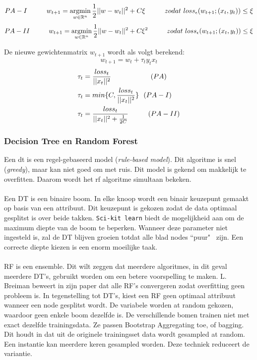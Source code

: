\[
   PA-I \hspace*{1cm} w_{t+1}= \operatorname*{argmin}_{w \in \mathbb{R}^n}
     \frac{1}{2}||w-w_t||^2 + C\xi \hspace*{1cm} zodat \ loss_{\epsilon} (w_{t+1};(x_t,y_t)) \leq \xi
\]
\[
   PA-II \hspace*{1cm} w_{t+1}= \operatorname*{argmin}_{w \in \mathbb{R}^n}
     \frac{1}{2}||w-w_t||^2 + C\xi^2 \hspace*{1cm} zodat \ loss_{\epsilon} (w_{t+1};(x_t,y_t)) \leq \xi
\]

De nieuwe gewichtenmatrix $w_{t+1}$ wordt als volgt berekend:
\[
w_{t+1}=w_t+ \tau_t y_t x_t
\]
\begin{align*}
\tau_t &= \frac{loss_t}{||x_t||^2} \tab \tab (PA)\\
\tau_t &= min \{ C, \frac{loss_t}{||x_t||^2} \} \ \ (PA-I)\\
\tau_t &= \frac{loss_t}{||x_t||^2+\frac{1}{2C}} \tab (PA-II) 
\end{align*}


\subsubsection*{Decision Tree en Random Forest}
Een \gls{dt} is een regel-gebaseerd model (\textit{rule-based model}). Dit algoritme is snel (\textit{greedy}), maar kan niet goed om met ruis. Dit model is gekend om makkelijk te overfitten. Daarom wordt het \gls{rf} algoritme simultaan bekeken.
\\\\
Een DT is een binaire boom. In elke knoop wordt een binair keuzepunt gemaakt op basis van een attribuut. Dit keuzepunt is gekozen zodat de data optimaal gesplitst is over beide takken. \texttt{Sci-kit learn} biedt de mogelijkheid aan om de maximum diepte van de boom te beperken. Wanneer deze parameter niet ingesteld is, zal de DT blijven groeien totdat alle blad nodes ``puur" \ zijn. Een correcte diepte kiezen is een enorm moeilijke taak.
\\\\ 
RF is een ensemble. Dit wilt zeggen dat meerdere algoritmes, in dit geval meerdere DT’s, gebruikt worden om een betere voorspelling te maken. L. Breiman \cite{randomforest paper} beweert in zijn paper dat alle RF’s convergeren zodat overfitting geen probleem is. In tegenstelling tot DT’s, kiest een RF geen optimaal attribuut wanneer een node gesplitst wordt. De variabele worden at random gekozen, waardoor geen enkele boom dezelfde is. De verschillende bomen trainen niet met exact dezelfde trainingsdata. Ze passen Bootstrap Aggregating toe, of bagging. Dit houdt in dat uit de originele trainingsset data wordt gesampled at random. Een instantie kan meerdere keren gesampled worden. Deze techniek reduceert de variantie.
